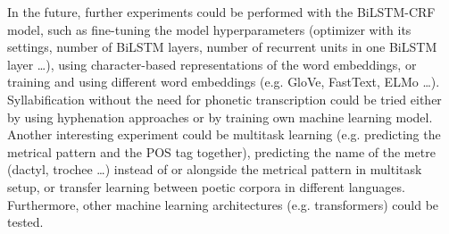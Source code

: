 In the future, further experiments could be performed with the BiLSTM-CRF model, such as fine-tuning the model hyperparameters (optimizer with its settings, number of BiLSTM layers, number of recurrent units in one BiLSTM layer \ldots), using character-based representations of the word embeddings,
or training and using different word embeddings (e.g. GloVe, FastText, ELMo \ldots). Syllabification without the need for phonetic transcription could be tried either by using hyphenation approaches or by training own machine learning model. Another interesting experiment could be multitask learning (e.g. predicting the metrical pattern and the POS tag together), predicting the name of the metre (dactyl, trochee \ldots) instead of or alongside the metrical pattern in multitask setup, or transfer learning between poetic corpora in different languages. Furthermore, other machine learning architectures (e.g. transformers) could be tested.